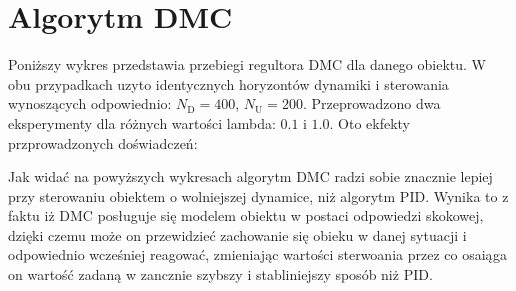 \section{Algorytm DMC}
Poniższy wykres przedstawia przebiegi regultora DMC dla danego obiektu. W obu przypadkach uzyto identycznych horyzontów dynamiki i sterowania wynoszących odpowiednio: $N_\mathrm{D}=400$, $N_\mathrm{U}=200$. Przeprowadzono dwa eksperymenty dla różnych wartości lambda: $0.1$ i $1.0$. Oto ekfekty przprowadzonych doświadczeń:
\begin{figure}
	
\end{figure}
\begin{figure}
	
\end{figure}
\FloatBarrier
Jak widać na powyższych wykresach algorytm DMC radzi sobie znacznie lepiej przy sterowaniu obiektem o wolniejszej dynamice, niż algorytm PID. Wynika to z faktu iż DMC posługuje się modelem obiektu w postaci odpowiedzi skokowej, dzięki czemu może on przewidzieć zachowanie się obieku w danej sytuacji i odpowiednio wcześniej reagować, zmieniając wartości sterwoania przez co osaiąga on wartość zadaną w zancznie szybszy i stabliniejszy sposób niż PID.